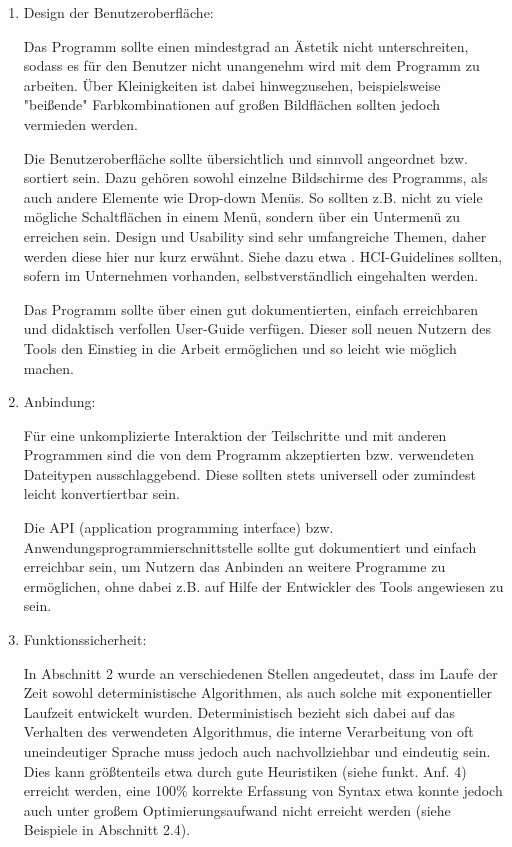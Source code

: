 \documentclass[12pt]{report}
\begin{document}
\begin{enumerate}
\item Design der Benutzeroberfläche:

Das Programm sollte einen mindestgrad an Ästetik nicht unterschreiten, sodass es für den Benutzer nicht unangenehm wird mit dem Programm zu arbeiten. Über Kleinigkeiten ist dabei hinwegzusehen, beispielsweise "beißende" Farbkombinationen auf großen Bildflächen sollten jedoch vermieden werden. 

Die Benutzeroberfläche sollte übersichtlich und sinnvoll angeordnet bzw. sortiert sein. Dazu gehören sowohl einzelne Bildschirme des Programms, als auch andere Elemente wie Drop-down Menüs. So sollten z.B. nicht zu viele mögliche Schaltflächen in einem Menü, sondern über ein Untermenü zu erreichen sein. Design und Usability sind sehr umfangreiche Themen, daher werden diese hier nur kurz erwähnt. Siehe dazu etwa \cite{shn10}. HCI-Guidelines sollten, sofern im Unternehmen vorhanden, selbstverständlich eingehalten werden.

Das Programm sollte über einen gut dokumentierten, einfach erreichbaren und didaktisch verfollen User-Guide verfügen. Dieser soll neuen Nutzern des Tools den Einstieg in die Arbeit ermöglichen und so leicht wie möglich machen.


\item Anbindung:

Für eine unkomplizierte Interaktion der Teilschritte und mit anderen Programmen sind die von dem Programm akzeptierten bzw. verwendeten Dateitypen ausschlaggebend. Diese sollten stets universell oder zumindest leicht konvertiertbar sein. 

Die API (application programming interface) bzw. Anwendungsprogrammierschnittstelle sollte gut dokumentiert und einfach erreichbar sein, um Nutzern das Anbinden an weitere Programme zu ermöglichen, ohne dabei z.B. auf Hilfe der Entwickler des Tools angewiesen zu sein. 
 
\item Funktionssicherheit:

In Abschnitt 2 wurde an verschiedenen Stellen angedeutet, dass im Laufe der Zeit sowohl deterministische Algorithmen, als auch solche mit exponentieller Laufzeit entwickelt wurden. Deterministisch bezieht sich dabei auf das Verhalten des verwendeten Algorithmus, die interne Verarbeitung von oft uneindeutiger Sprache muss jedoch auch nachvollziehbar und eindeutig sein. Dies kann größtenteils etwa durch gute Heuristiken (siehe funkt. Anf. 4) erreicht werden, eine 100\% korrekte Erfassung von Syntax etwa konnte jedoch auch unter großem Optimierungsaufwand nicht erreicht werden (siehe Beispiele in Abschnitt 2.4). 


\end{enumerate}
\end{document}
